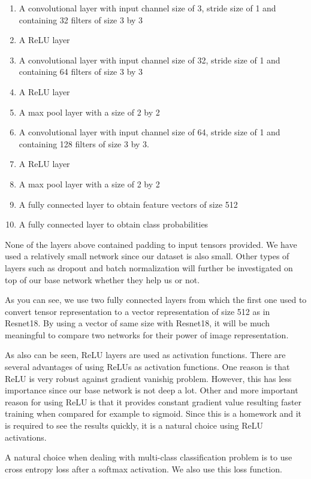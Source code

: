 \documentclass{article}
\begin{document}
  \begin{enumerate}
    \item A convolutional layer with input channel size of 3, stride size of 1 and containing 32 filters of size 3 by 3
    \item A ReLU layer
    \item A convolutional layer with input channel size of 32, stride size of 1 and containing 64 filters of size 3 by 3
    \item A ReLU layer
    \item A max pool layer with a size of 2 by 2
    \item A convolutional layer with input channel size of 64, stride size of 1 and containing 128 filters of size 3 by 3.
    \item A ReLU layer
    \item A max pool layer with a size of 2 by 2
    \item A fully connected layer to obtain feature vectors of size 512
    \item A fully connected layer to obtain class probabilities
  \end{enumerate}%
  
None of the layers above contained padding to input tensors provided. We have used a relatively small network since our dataset is also small. Other types of layers such as dropout and batch normalization will further be investigated on top of our base network whether they help us or not.

As you can see, we use two fully connected layers from which the first one used to convert tensor representation to a vector representation of size 512 as in Resnet18. By using a vector of same size with Resnet18, it will be much meaningful to compare two networks for their power of image representation.

As also can be seen, ReLU layers are used as activation functions. There are several advantages of using ReLUs as activation functions. One reason is that ReLU is very robust against gradient vanishig problem. However, this has less importance since our base network is not deep a lot. Other and more important reason for using ReLU is that it provides constant gradient value resulting faster training when compared for example to sigmoid. Since this is a homework and it is required to see the results quickly, it is a natural choice using ReLU activations.

A natural choice when dealing with multi-class classification problem is to use cross entropy loss after a softmax activation. We also use this loss function.
\end{document}
